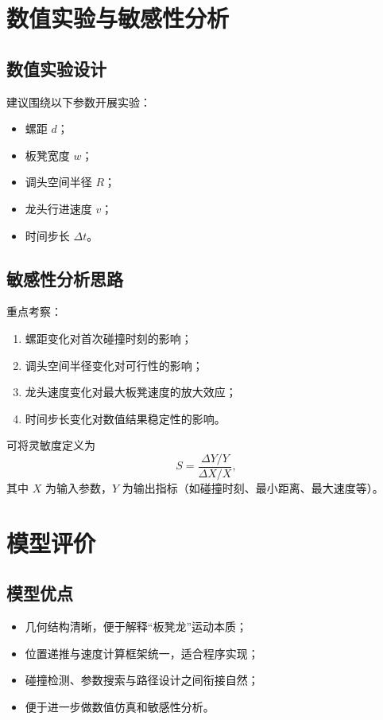 \documentclass[12pt,a4paper]{ctexart}
\begin{document}
\section{数值实验与敏感性分析}

\subsection{数值实验设计}
建议围绕以下参数开展实验：
\begin{itemize}[leftmargin=2em]
    \item 螺距 $d$；
    \item 板凳宽度 $w$；
    \item 调头空间半径 $R$；
    \item 龙头行进速度 $v$；
    \item 时间步长 $\Delta t$。
\end{itemize}

\subsection{敏感性分析思路}
重点考察：
\begin{enumerate}[leftmargin=2em]
    \item 螺距变化对首次碰撞时刻的影响；
    \item 调头空间半径变化对可行性的影响；
    \item 龙头速度变化对最大板凳速度的放大效应；
    \item 时间步长变化对数值结果稳定性的影响。
\end{enumerate}

可将灵敏度定义为
\begin{equation}
S=\frac{\Delta Y / Y}{\Delta X / X},
\end{equation}
其中 $X$ 为输入参数，$Y$ 为输出指标（如碰撞时刻、最小距离、最大速度等）。

\section{模型评价}

\subsection{模型优点}
\begin{itemize}[leftmargin=2em]
    \item 几何结构清晰，便于解释“板凳龙”运动本质；
    \item 位置递推与速度计算框架统一，适合程序实现；
    \item 碰撞检测、参数搜索与路径设计之间衔接自然；
    \item 便于进一步做数值仿真和敏感性分析。
\end{itemize}
\end{document}
